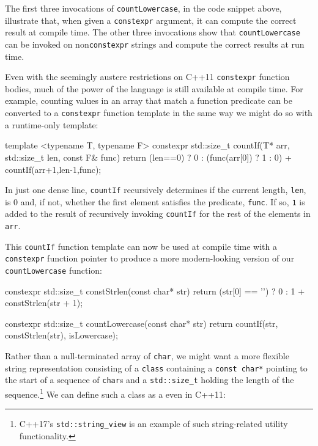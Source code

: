 \noindent The first three invocations of \lstinline!countLowercase!, in the code
snippet above, illustrate that, when given a \lstinline!constexpr!
argument, it can compute the correct result at compile time. The other
three invocations show that \lstinline!countLowercase! can be invoked on
non\lstinline!constexpr! strings and compute the correct results at run
time.

Even with the seemingly austere restrictions on C++11 \lstinline!constexpr!
function bodies, much of the power of the language is still available at
compile time. For example, counting values in an array that match a
function predicate can be converted to a \lstinline!constexpr! function
template in the same way we might do so with a runtime-only template:

\begin{emcppslisting}[emcppsbatch={e12,e13}]
template <typename T, typename F>
constexpr std::size_t countIf(T* arr, std::size_t len, const F& func)
{
    return (len==0) ? 0 : (func(arr[0]) ? 1 : 0) + countIf(arr+1,len-1,func);
}
\end{emcppslisting}


\noindent In just one dense line, \lstinline!countIf! recursively determines if the
current length, \lstinline!len!, is 0 and, if not, whether the first
element satisfies the predicate, \lstinline!func!. If so, \lstinline!1! is
added to the result of recursively invoking \lstinline!countIf! for the
rest of the elements in \lstinline!arr!.

This \lstinline!countIf! function template can now be used at compile time
with a \lstinline!constexpr! function pointer to produce a more
modern-looking version of our \lstinline!countLowercase! function:

\begin{emcppshiddenlisting}[emcppsbatch=e13]
constexpr std::size_t constStrlen(const char* str)
{
    return (str[0] == '\0') ? 0 : 1 + constStrlen(str + 1);
}
\end{emcppshiddenlisting}
\begin{emcppslisting}[emcppsbatch=e13]
constexpr std::size_t countLowercase(const char* str)
{
    return countIf(str, constStrlen(str), isLowercase);
}
\end{emcppslisting}


\noindent Rather than a null-terminated array of \lstinline!char!, we might want a
more flexible string representation consisting of a \lstinline!class!
containing a \lstinline!const!~\lstinline!char*! pointing to the start of a
sequence of \lstinline!char!s and a \lstinline!std::size_t! holding the
length of the sequence.{\cprotect\footnote{C++17's
\lstinline!std::string_view! is an example of such string-related
  utility functionality.}} We can define such a class as a
 even in C++11:


